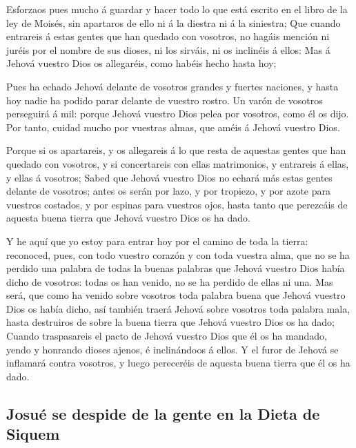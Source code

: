  Esforzaos pues mucho á guardar y hacer todo lo que está
escrito en el libro de la ley de Moisés, sin apartaros de ello ni á la
diestra ni á la siniestra;  Que cuando entrareis á estas
gentes que han quedado con vosotros, no hagáis mención ni juréis por el
nombre de sus dioses, ni los sirváis, ni os inclinéis á ellos:
 Mas á Jehová vuestro Dios os allegaréis, como habéis hecho
hasta hoy;

 Pues ha echado Jehová delante de vosotros grandes y fuertes
naciones, y hasta hoy nadie ha podido parar delante de vuestro rostro.
 Un varón de vosotros perseguirá á mil: porque Jehová
vuestro Dios pelea por vosotros, como él os dijo.  Por
tanto, cuidad mucho por vuestras almas, que améis á Jehová vuestro Dios.

 Porque si os apartareis, y os allegareis á lo que resta de
aquestas gentes que han quedado con vosotros, y si concertareis con
ellas matrimonios, y entrareis á ellas, y ellas á vosotros;
 Sabed que Jehová vuestro Dios no echará más estas gentes
delante de vosotros; antes os serán por lazo, y por tropiezo, y por
azote para vuestros costados, y por espinas para vuestros ojos, hasta
tanto que perezcáis de aquesta buena tierra que Jehová vuestro Dios os
ha dado.

 Y he aquí que yo estoy para entrar hoy por el camino de
toda la tierra: reconoced, pues, con todo vuestro corazón y con toda
vuestra alma, que no se ha perdido una palabra de todas la buenas
palabras que Jehová vuestro Dios había dicho de vosotros: todas os han
venido, no se ha perdido de ellas ni una.  Mas será, que
como ha venido sobre vosotros toda palabra buena que Jehová vuestro Dios
os había dicho, así también traerá Jehová sobre vosotros toda palabra
mala, hasta destruiros de sobre la buena tierra que Jehová vuestro Dios
os ha dado;  Cuando traspasareis el pacto de Jehová vuestro
Dios que él os ha mandado, yendo y honrando dioses ajenos, é
inclinándoos á ellos. Y el furor de Jehová se inflamará contra vosotros,
y luego pereceréis de aquesta buena tierra que él os ha dado.

\hypertarget{josuuxe9-se-despide-de-la-gente-en-la-dieta-de-siquem}{%
\subsection{Josué se despide de la gente en la Dieta de
Siquem}\label{josuuxe9-se-despide-de-la-gente-en-la-dieta-de-siquem}}

